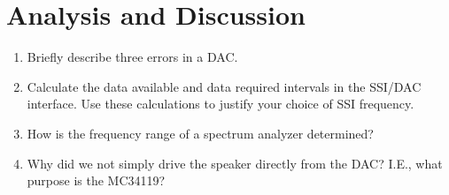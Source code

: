 \documentclass{article}
\begin{document}
\section{Analysis and Discussion}
\begin{enumerate}
	\item %
		Briefly describe three errors in a DAC.
	\item %
		Calculate the data available and data required intervals in the SSI/DAC interface. Use these calculations to justify your choice of SSI frequency.
	\item %
		How is the frequency range of a spectrum analyzer determined?
	\item %
		Why did we not simply drive the speaker directly from the DAC? I.E., what purpose is the MC34119?
\end{enumerate}
\end{document}
